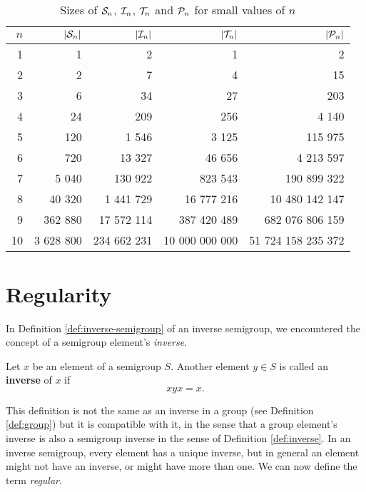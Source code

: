 \begin{table}[h]
  \centering
  \renewcommand\arraystretch{1.0}
  \begin{tabular}{| r | r | r | r | r |}
    \hline
    $n$ & $|\mathcal{S}_n|$ & $|\mathcal{I}_n|$ & $|\mathcal{T}_n|$ & $|\mathcal{P}_n|$ \\
    \hline
     1 &         1&           2&              1&                  2 \\
     2 &         2&           7&              4&                 15 \\
     3 &         6&          34&             27&                203 \\
     4 &        24&         209&            256&              4 140 \\
     5 &       120&       1 546&          3 125&            115 975 \\
     6 &       720&      13 327&         46 656&          4 213 597 \\
     7 &     5 040&     130 922&        823 543&        190 899 322 \\
     8 &    40 320&   1 441 729&     16 777 216&     10 480 142 147 \\
     9 &   362 880&  17 572 114&    387 420 489&    682 076 806 159 \\
    10 & 3 628 800& 234 662 231& 10 000 000 000& 51 724 158 235 372 \\
    \hline
  \end{tabular}
  \renewcommand\arraystretch{0.7}
  \caption{Sizes of $\mathcal{S}_n$, $\mathcal{I}_n$, $\mathcal{T}_n$ and $\mathcal{P}_n$ for small values of
    $n$}
  \label{tab:pn-size}
\end{table}

\section{Regularity}
\label{sec:intro-regularity}

In Definition \ref{def:inverse-semigroup} of an inverse semigroup, we
encountered the concept of a semigroup element's \textit{inverse}.

\begin{definition}
  \label{def:inverse}
  Let $x$ be an element of a semigroup $S$.  Another element $y \in S$ is called
  an \textbf{inverse} of $x$ if
  $$xyx = x.$$
\end{definition}

This definition is not the same as an inverse in a group (see Definition
\ref{def:group}) but it is compatible with it, in the sense that a group
element's inverse is also a semigroup inverse in the sense of Definition
\ref{def:inverse}.  In an inverse semigroup, every element has a unique inverse,
but in general an element might not have an inverse, or might have more than
one.  We can now define the term \textit{regular}.


